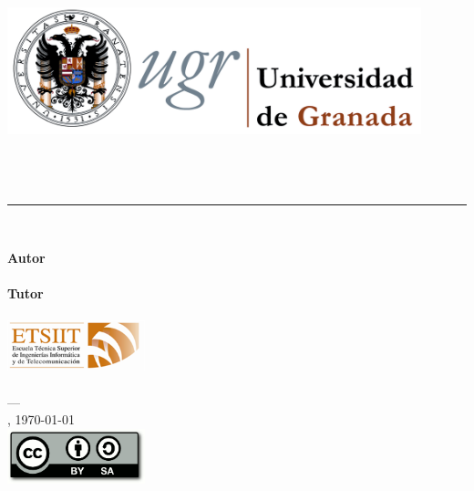 \begin{titlepage}

\newlength{\centeroffset}
\setlength{\centeroffset}{-0.5\oddsidemargin}
\addtolength{\centeroffset}{0.5\evensidemargin}

\noindent\hspace*{\centeroffset}\begin{minipage}{\textwidth}

\centering
\includegraphics[width=0.9\textwidth]{../images/logo_ugr.png}\\[1.4cm]

\textsc{\Large\asunto\\[0.2cm]}
\textsc{\grado}\\[1cm]

{\Huge\bfseries \titulo\\}
\noindent\rule[-1ex]{\textwidth}{3pt}\\[3.5ex]
\end{minipage}

\vspace{2cm}
\noindent\hspace*{\centeroffset}\begin{minipage}{\textwidth}
\centering

\textbf{Autor}\\ {\autor}\\[2.5ex]
\textbf{Tutor}\\ {\tutor}\\[2cm]
\includegraphics[width=0.3\textwidth]{../images/logo_etsiit.png}\\[0.1cm]
\textsc{\escuela}\\
\textsc{---}\\
\ciudad, \today\\
\includegraphics[width=0.3\textwidth]{../images/CC-SA-logo.png}
\end{minipage}
\end{titlepage}